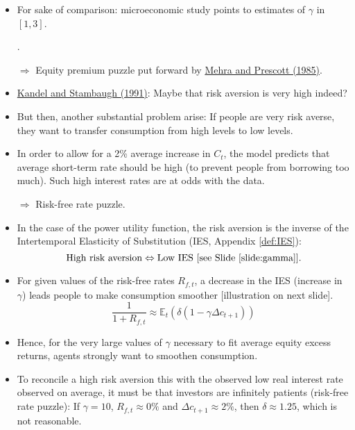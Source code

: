 \begin{frame}\label{slide:rfpuzzle}
\begin{footnotesize}
\begin{itemize}
	\item For sake of comparison: microeconomic study points to estimates of $\gamma$ in $[1,3]$. \begin{scriptsize}\end{scriptsize}.
	\item[$\Rightarrow$] {\color{blue}Equity premium puzzle} put forward by \href{http://www.sciencedirect.com/science/article/pii/0304393285900613}{Mehra and Prescott (1985)}.
	\item \href{http://www.sciencedirect.com/science/article/pii/0304393291900048}{Kandel and Stambaugh (1991)}: Maybe that risk aversion is very high indeed?
	\item But then, another substantial problem arise: If people are very risk averse, they want to transfer consumption from high levels to low levels.
	\item In order to allow for a 2\% average increase in $C_t$, the model predicts that average short-term rate should be high (to prevent people from borrowing too much). Such high interest rates are at odds with the data.
	\item[$\Rightarrow$] {\color{blue}Risk-free rate puzzle}.
\end{itemize}
\end{footnotesize}
\end{frame}


\begin{frame}
\begin{footnotesize}
\begin{itemize}
	\item In the case of the power utility function, the risk aversion is the inverse of the Intertemporal Elasticity of Substitution (IES, Appendix \ref{def:IES}):
	$$
	\mbox{High risk aversion} \Leftrightarrow \mbox{Low IES [see Slide \ref{slide:gamma}]}.
	$$
	\item For given values of the risk-free rates $R_{f,t}$, a decrease in the IES (increase in $\gamma$) leads people to make consumption smoother [illustration on next slide].
	$$
	\frac{1}{1+R_{f,t}} \approx \mathbb{E}_t(\delta (1 - \gamma \Delta c_{t+1}))
	$$
	\item Hence, for the very large values of $\gamma$ necessary to fit average equity excess returns, agents strongly want to smoothen consumption.
	\item To reconcile a high risk aversion this with the observed low real interest rate observed on average, it must be that investors are infinitely patients ({\color{blue}risk-free rate puzzle}):
	If $\gamma=10$, $R_{f,t} \approx 0\%$ and $\Delta c_{t+1} \approx 2\%$, then $\delta \approx 1.25$, which is not reasonable.
\end{itemize}
\end{footnotesize}
\end{frame}


